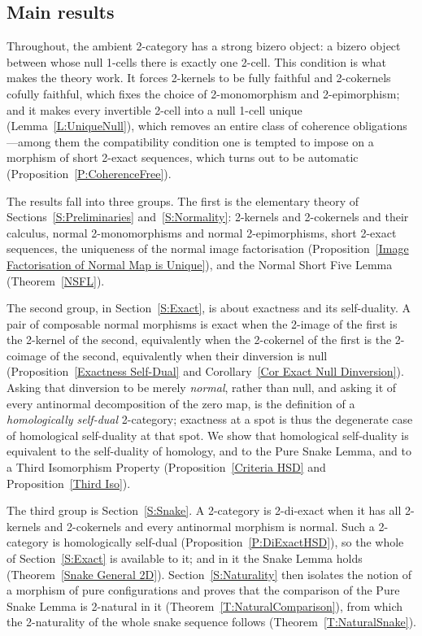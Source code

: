 \documentclass[reqno,a4paper]{amsart}
\numberwithin{equation}{section}
\theoremstyle{plain}
\theoremstyle{definition}
\def\nameit#1{\textrm{#1}~}
\def\thex{\nameit{Theorem}}
\def\prox{\nameit{Proposition}}
\def\corx{\nameit{Corollary}}
\def\lemx{\nameit{Lemma}}
\def\dfn#1{{\itshape #1}}
\renewcommand{\1}{\onecat{1}}
\begin{document}
\subsection{Main results}\label{SS:MainResults}

Throughout, the ambient 2-category has a strong bizero object: a bizero object between whose null 1-cells there is exactly one 2-cell. This condition is what makes the theory work. It forces 2-kernels to be fully faithful and 2-cokernels cofully faithful, which fixes the choice of 2-monomorphism and 2-epimorphism; and it makes every invertible 2-cell into a null 1-cell unique (\lemx\ref{L:UniqueNull}), which removes an entire class of coherence obligations---among them the compatibility condition one is tempted to impose on a morphism of short 2-exact sequences, which turns out to be automatic (\prox\ref{P:CoherenceFree}).

The results fall into three groups. The first is the elementary theory of Sections~\ref{S:Preliminaries} and~\ref{S:Normality}: 2-kernels and 2-cokernels and their calculus, normal 2-monomorphisms and normal 2-epimorphisms, short 2-exact sequences, the uniqueness of the normal image factorisation (\prox\ref{Image Factorisation of Normal Map is Unique}), and the Normal Short Five Lemma (\thex\ref{NSFL}).

The second group, in Section~\ref{S:Exact}, is about exactness and its self-duality. A pair of composable normal morphisms is exact when the 2-image of the first is the 2-kernel of the second, equivalently when the 2-cokernel of the first is the 2-coimage of the second, equivalently when their dinversion is null (\prox\ref{Exactness Self-Dual} and \corx\ref{Cor Exact Null Dinversion}). Asking that dinversion to be merely \emph{normal}, rather than null, and asking it of every antinormal decomposition of the zero map, is the definition of a \dfn{homologically self-dual} 2-category; exactness at a spot is thus the degenerate case of homological self-duality at that spot. We show that homological self-duality is equivalent to the self-duality of homology, and to the Pure Snake Lemma, and to a Third Isomorphism Property (\prox\ref{Criteria HSD} and \prox\ref{Third Iso}).

The third group is Section~\ref{S:Snake}. A 2-category is 2-di-exact when it has all 2-kernels and 2-cokernels and every antinormal morphism is normal. Such a 2-category is homologically self-dual (\prox\ref{P:DiExactHSD}), so the whole of Section~\ref{S:Exact} is available to it; and in it the Snake Lemma holds (\thex\ref{Snake General 2D}). Section~\ref{S:Naturality} then isolates the notion of a morphism of pure configurations and proves that the comparison of the Pure Snake Lemma is 2-natural in it (\thex\ref{T:NaturalComparison}), from which the 2-naturality of the whole snake sequence follows (\thex\ref{T:NaturalSnake}).
\end{document}

